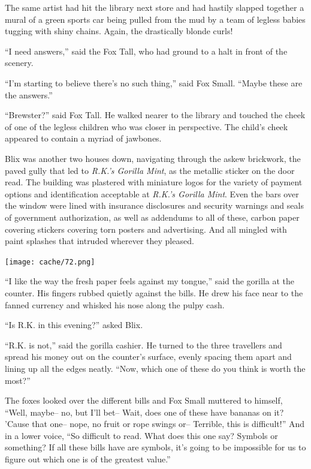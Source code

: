 \documentclass[12pt,twoside]{report}
\begin{document}
The same artist had hit the library next store and had hastily slapped
together a mural of a green sports car being pulled from the mud by a
team of legless babies tugging with shiny chains. Again, the
drastically blonde curls!

``I need answers,'' said the Fox Tall, who had ground to a halt in
front of the scenery.

``I'm starting to believe there's no such thing,'' said Fox Small.
``Maybe these are the answers.''

``Brewster?'' said Fox Tall.  He walked nearer to the library and
touched the cheek of one of the legless children who was closer in
perspective.  The child's cheek appeared to contain a myriad of
jawbones.

Blix was another two houses down, navigating through the askew
brickwork, the paved gully that led to {\em R.K.'s Gorilla Mint}, as
the metallic sticker on the door read.  The building was plastered
with miniature logos for the variety of payment options and
identification acceptable at {\em R.K.'s Gorilla Mint}.  Even the bars
over the window were lined with insurance disclosures and security
warnings and seals of government authorization, as well as addendums
to all of these, carbon paper covering stickers covering torn posters
and advertising.  And all mingled with paint splashes that intruded
wherever they pleased.

	\texttt{[image: cache/72.png]}

``I like the way the fresh paper feels against my tongue,'' said the
        gorilla at the counter. His fingers rubbed quietly against the
        bills.  He drew his face near to the fanned currency and
        whisked his nose along the pulpy cash.

``Is R.K. in this evening?'' asked Blix.

``R.K. is not,'' said the gorilla cashier.  He turned to the three
        travellers and spread his money out on the counter's surface,
        evenly spacing them apart and lining up all the edges neatly.
        ``Now, which one of these do you think is worth the most?''

The foxes looked over the different bills and Fox Small muttered to
himself, ``Well, maybe-- no, but I'll bet-- Wait, does one of these
have bananas on it?  'Cause that one-- nope, no fruit or rope swings
or-- Terrible, this is difficult!''  And in a lower voice, ``So
difficult to read.  What does this one say?  Symbols or something? If
all these bills have are symbols, it's going to be impossible for us
to figure out which one is of the greatest value.''
\end{document}
